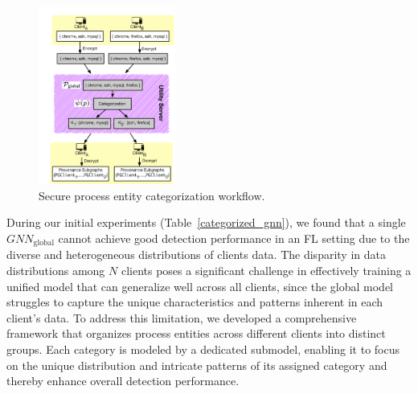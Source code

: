 
\begin{figure}[t!]
    \centering
    \includegraphics[width=0.4\textwidth]{fig/categorization_flow.pdf}
    \caption{Secure process entity categorization workflow.}
    \label{proc:cate}
    \vspace{-3ex}
  \end{figure}

During our initial experiments (Table~\ref{categorized_gnn}), we found that a single \( {GNN}_{\text{global}} \) cannot achieve good detection performance in an FL setting due to the diverse and heterogeneous distributions of clients data. The disparity in data distributions among \( N \) clients poses a significant challenge in effectively training a unified model that can generalize well across all clients, since the global model struggles to capture the unique characteristics and patterns inherent in each client's data. To address this limitation, we developed a comprehensive framework that organizes process entities across different clients into distinct groups. Each category is modeled by a dedicated submodel, enabling it to focus on the unique distribution and intricate patterns of its assigned category and thereby enhance overall detection performance.

